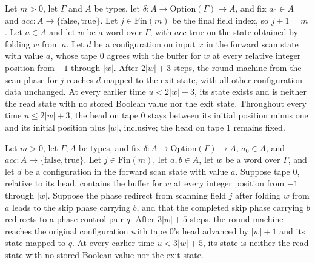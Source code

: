\begin{theorem}
\label{Turing.rt_find_last_accept}
\leanok
{}
Let $m>0$, let $\Gamma$ and $A$ be types, let $\delta:A\to\mathrm{Option}(\Gamma)\to A$,
and fix $a_0\in A$ and $acc:A\to\{\mathrm{false},\mathrm{true}\}$. Let $j\in\mathrm{Fin}(m)$
be the final field index, so $j+1=m$. Let $a\in A$ and let $w$ be a word over $\Gamma$,
with $acc$ true on the state obtained by folding $w$ from $a$. Let $d$ be a configuration
on input $x$ in the forward scan state with value $a$, whose tape $0$ agrees with the
buffer for $w$ at every relative integer position from $-1$ through $|w|$. After
$2|w|+3$ steps, the round machine from the scan phase for $j$ reaches $d$ mapped to the
exit state, with all other configuration data unchanged. At every earlier time $u<2|w|+3$,
its state exists and is neither the read state with no stored Boolean value nor the exit
state. Throughout every time $u\le2|w|+3$, the head on tape $0$ stays between its initial
position minus one and its initial position plus $|w|$, inclusive; the head on tape $1$
remains fixed.
\end{theorem}

\begin{theorem}
\label{Turing.rt_find_advance}
\leanok
{}
Let $m>0$, let $\Gamma,A$ be types, and fix $\delta:A\to\mathrm{Option}(\Gamma)\to A$,
$a_0\in A$, and $acc:A\to\{\mathrm{false},\mathrm{true}\}$. Let $j\in\mathrm{Fin}(m)$,
let $a,b\in A$, let $w$ be a word over $\Gamma$, and let $d$ be a configuration in the
forward scan state with value $a$. Suppose tape $0$, relative to its head, contains the
buffer for $w$ at every integer position from $-1$ through $|w|$. Suppose the phase
redirect from scanning field $j$ after folding $w$ from $a$ leads to the skip phase
carrying $b$, and that the completed skip phase carrying $b$ redirects to a phase-control
pair $q$. After $3|w|+5$ steps, the round machine reaches the original configuration
with tape $0$'s head advanced by $|w|+1$ and its state mapped to $q$. At every earlier
time $u<3|w|+5$, its state is neither the read state with no stored Boolean value nor
the exit state.
\end{theorem}

